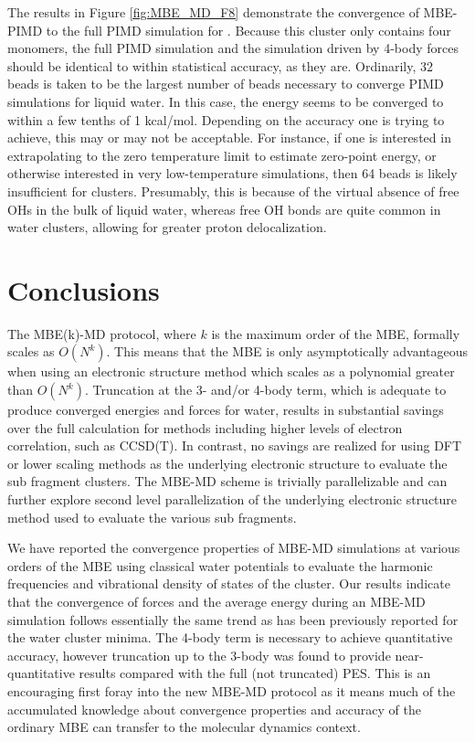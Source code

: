 \documentclass[11pt, proquest]{uwthesis}[2020/02/24]
\let\ce\ch
\begin{document}
\par The results in Figure \ref{fig:MBE_MD_F8} demonstrate the convergence of MBE-PIMD to the full PIMD simulation for \ce{(H2O)4}. Because this cluster only contains four monomers, the full PIMD simulation and the simulation driven by 4-body forces should be identical to within statistical accuracy, as they are. Ordinarily, 32 beads is taken to be the largest number of beads necessary to converge PIMD simulations for liquid water.\autocite{ceriotti_i-pi_2014} In this case, the energy seems to be converged to within a few tenths of 1 kcal/mol. Depending on the accuracy one is trying to achieve, this may or may not be acceptable. For instance, if one is interested in extrapolating to the zero temperature limit to estimate zero-point energy, or otherwise interested in very low-temperature simulations,\autocite{uhl_accelerated_2016,schran_quantum_2019} then 64 beads is likely insufficient for clusters. Presumably, this is because of the virtual absence of free OHs in the bulk of liquid water, whereas free OH bonds are quite common in water clusters, allowing for greater proton delocalization.

\section{Conclusions}

\par The MBE(k)-MD protocol, where $k$ is the maximum order of the MBE, formally scales as $O(N^k)$. This means that the MBE is only asymptotically advantageous when using an electronic structure method which scales as a polynomial greater than $O(N^k)$. Truncation at the 3- and/or 4-body term, which is adequate to produce converged energies and forces for water, results in substantial savings over the full calculation for methods including higher levels of electron correlation, such as CCSD(T). In contrast, no savings are realized for using DFT or lower scaling methods as the underlying electronic structure to evaluate the sub fragment clusters. The MBE-MD scheme is trivially parallelizable and can further explore second level parallelization of the underlying electronic structure method used to evaluate the various sub fragments.

\par We have reported the convergence properties of MBE-MD simulations at various orders of the MBE using classical water potentials to evaluate the harmonic frequencies and vibrational density of states of the \ce{(H2O)_{10}} cluster. Our results indicate that the convergence of forces and the average energy during an MBE-MD simulation follows essentially the same trend as has been previously reported for the water cluster minima. The 4-body term is necessary to achieve quantitative accuracy, however truncation up to the 3-body was found to provide near-quantitative results compared with the full (not truncated) PES. This is an encouraging first foray into the new MBE-MD protocol as it means much of the accumulated knowledge about convergence properties and accuracy of the ordinary MBE can transfer to the molecular dynamics context.
\end{document}
